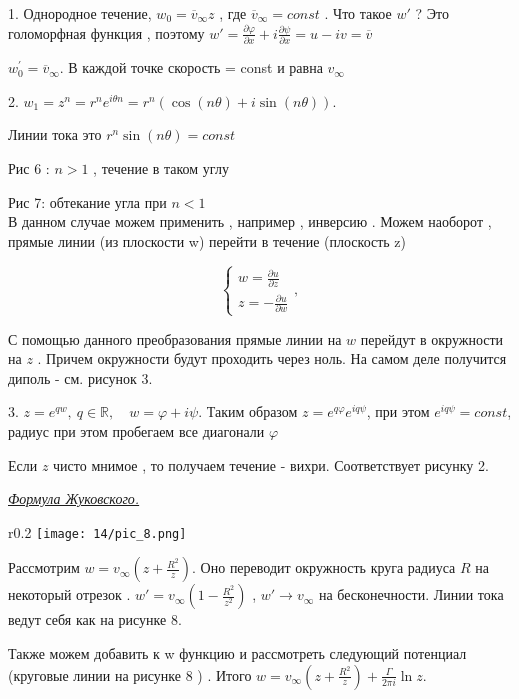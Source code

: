 1. Однородное течение, $w_0 = \overline{v}_{\infty} z$  , где $ \overline{v}_{\infty}  = const$ . Что такое $w'$ ? Это голоморфная функция , поэтому $w' = \frac{\partial \varphi}{\partial x} + i \frac{\partial \psi}{\partial x}  = u - iv = \overline{v}$


$w_0^{'} = \overline{v}_{\infty}$. В каждой точке скорость = const и равна $v_{\infty}$

2. $w_1 = z^n = r^n e^{i \theta n} = r^n(\cos(n \theta) + i \sin (n \theta) )$.

Линии тока это $r^n \sin(n \theta) = const $

Рис 6 : $n > 1$ , течение в таком углу

Рис 7: обтекание угла при $n < 1$ \\

В данном случае можем применить , например , инверсию . Можем наоборот , прямые линии (из плоскости w) перейти в течение (плоскость z)

$$ \begin{cases}
    w  = \frac{\partial u}{\partial z} \\
    z = -\frac{\partial u}{\partial w}
  \end{cases},$$

С помощью данного преобразования прямые линии на $w$ перейдут в окружности на $z$ . Причем окружности будут проходить через ноль. На самом деле получится диполь - см. рисунок 3.

3. $z = e^{q w}, \ q \in \mathbb{R} , \quad w = \varphi + i \psi$. Таким образом $z = e^{q \varphi} e^{i q \psi}$, при этом $e^{i q \psi} = const$, радиус при этом пробегаем все диагонали $\varphi$

Если $z$ чисто мнимое , то получаем течение - вихри. Соответствует рисунку 2.

\begin{center}
  \textit{\underline{Формула Жуковского.}}
\end{center}

\begin{wrapfigure}{r}{0.2\textwidth}
  \texttt{[image: 14/pic\_8.png]}
  \caption{\label{ris:image14.8}}
\end{wrapfigure}

Рассмотрим $w=v_{\infty}(z + \frac{R^2}{z})$. Оно переводит окружность круга радиуса $R$ на некоторый отрезок . $w' = v_{\infty} ( 1 -  \frac{R^2}{z^2})$ , $w' \rightarrow v_{\infty} $ на бесконечности. Линии тока ведут себя как на рисунке 8.

Также можем добавить к w функцию и рассмотреть следующий потенциал (круговые линии на рисунке 8 ) . Итого $w = v_{\infty}(z + \frac{R^2}{z}) + \frac{\Gamma}{2 \pi i} \ln z$.

